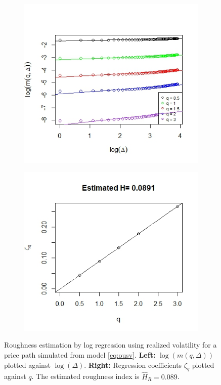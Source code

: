 \documentclass{article}
\begin{document}
\begin{figure}[htbp]
    \centering
    
    \begin{subfigure}{0.48\textwidth}
        \includegraphics[width=\linewidth]{ex6_logRV1.jpeg}
    \end{subfigure}
    \hfill
    \begin{subfigure}{0.48\textwidth}
        \includegraphics[width=\linewidth]{ex6_logRV2.jpeg}
    \end{subfigure}
    
    \caption{Roughness estimation by log regression using realized volatility for a price path simulated from model \eqref{eq:ousv}. \textbf{Left:} $\log(m(q,\Delta))$ plotted against $\log(\Delta)$. \textbf{Right:} Regression coefficients $\zeta_q$ plotted against $q$. The estimated roughness index is $\hat{H}_R=0.089$.}
    \label{fig:ex6logRV}
\end{figure}\\\\
\end{document}
